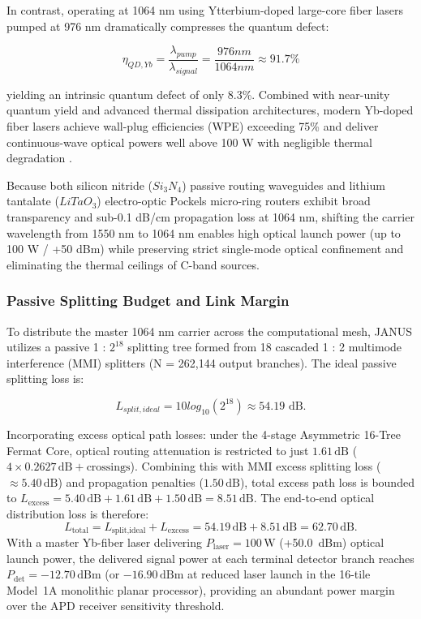 \documentclass[journal]{IEEEtran}
\begin{document}
In contrast, operating at 1064 nm using Ytterbium-doped large-core fiber lasers pumped at 976 nm dramatically compresses the quantum defect:

\begin{equation}
\eta_{QD,Yb} = \frac{\lambda_{pump}}{\lambda_{signal}}
= \frac{976 nm}{1064 nm} \approx 91.7\% 
\end{equation}

yielding an intrinsic quantum defect of only 8.3\%. Combined with near-unity quantum yield and advanced thermal dissipation architectures, modern Yb-doped fiber lasers achieve wall-plug efficiencies (WPE) exceeding 75\% and deliver continuous-wave optical powers well above 100 W with negligible thermal degradation \cite{Jeong2004}.

Because both silicon nitride ($Si_3N_4$) passive routing waveguides and lithium tantalate ($LiTaO_3$) electro-optic Pockels micro-ring routers exhibit broad transparency and sub-0.1 dB/cm propagation loss at 1064 nm, shifting the carrier wavelength from 1550 nm to 1064 nm enables high optical launch power (up to 100 W / +50 dBm) while preserving strict single-mode optical confinement and eliminating the thermal ceilings of C-band sources.

\subsubsection{\textbf{Passive Splitting Budget and Link Margin}}

To distribute the master 1064 nm carrier across the computational mesh, JANUS utilizes a passive 1 : $2^{18}$ splitting tree formed from
18 cascaded 1 : 2 multimode interference (MMI) splitters (N = 262,144 output branches). The ideal passive splitting loss is:

\begin{equation}
L_{split,ideal} = 10 log_{10}(2^{18}) \approx 54.19 \text{ dB.}
\end{equation}

Incorporating excess optical path losses: under the 4-stage Asymmetric 16-Tree Fermat Core, optical routing attenuation is restricted to just $1.61\,\text{dB}$ ($4 \times 0.2627\,\text{dB} + \text{crossings}$). Combining this with MMI excess splitting loss ($\approx 5.40\,\text{dB}$) and propagation penalties ($1.50\,\text{dB}$), total excess path loss is bounded to $L_{\text{excess}} = 5.40\,\text{dB} + 1.61\,\text{dB} + 1.50\,\text{dB} = 8.51\,\text{dB}$. The end-to-end optical distribution loss is therefore:
\begin{equation}
L_{\text{total}} = L_{\text{split,ideal}} + L_{\text{excess}} = 54.19\,\text{dB} + 8.51\,\text{dB} = 62.70\,\text{dB}.
\end{equation}
With a master Yb-fiber laser delivering $P_{\text{laser}} = 100\,\text{W}$ (+50.0~dBm) optical launch power, the delivered signal power at each terminal detector branch reaches $P_{\text{det}} = -12.70\,\text{dBm}$ (or $-16.90\,\text{dBm}$ at reduced laser launch in the 16-tile Model~1A monolithic planar processor), providing an abundant power margin over the APD receiver sensitivity threshold.
\end{document}
